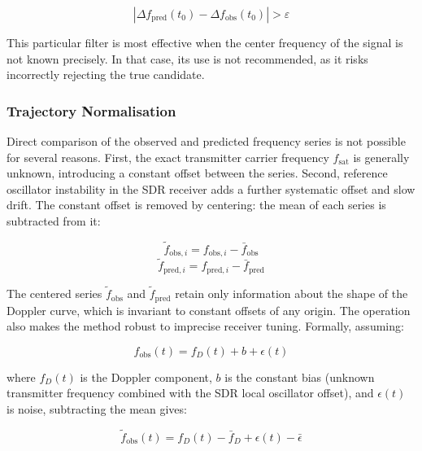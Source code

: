 \documentclass[lineno,pdflatex,sn-basic,referee,]{sn-jnl}
\begin{document}
\begin{equation}
    \left|\Delta f_{\mathrm{pred}}(t_0) - \Delta f_{\mathrm{obs}}(t_0)\right|
    > \varepsilon
    \label{eq:doppler-prefilter}
\end{equation}

This particular filter is most effective when the center frequency of the signal is not known precisely. In that case, its use is not recommended, as it risks incorrectly rejecting the true candidate.

\subsubsection{Trajectory Normalisation}
\label{subsubsec:normalisation}

Direct comparison of the observed and predicted frequency series is not possible for several reasons. First, the exact transmitter carrier frequency $f_{\mathrm{sat}}$ is generally unknown, introducing a constant offset between the series. Second, reference oscillator instability in the SDR receiver adds a further systematic offset and slow drift. The constant offset is removed by centering: the mean of each series is subtracted from it:

\begin{equation}
    \tilde{f}_{\mathrm{obs},i} = f_{\mathrm{obs},i} - \bar{f}_{\mathrm{obs}}
    \label{eq:center-obs}
\end{equation}
\begin{equation}
    \tilde{f}_{\mathrm{pred},i} = f_{\mathrm{pred},i} - \bar{f}_{\mathrm{pred}}
    \label{eq:center-pred}
\end{equation}

The centered series $\tilde{f}_{\mathrm{obs}}$ and $\tilde{f}_{\mathrm{pred}}$ retain only information about the shape of the Doppler curve, which is invariant to constant offsets of any origin. The operation also makes the method robust to imprecise receiver tuning. Formally, assuming:

\begin{equation}
    f_{\mathrm{obs}}(t) = f_D(t) + b + \epsilon(t)
    \label{eq:noise-model}
\end{equation}

\noindent
where $f_D(t)$ is the Doppler component, $b$ is the constant bias (unknown transmitter frequency combined with the SDR local oscillator offset), and $\epsilon(t)$ is noise, subtracting the mean gives:

\begin{equation}
    \tilde{f}_{\mathrm{obs}}(t) = f_D(t) - \bar{f}_D + \epsilon(t) - \bar{\epsilon}
    \label{eq:after-centering}
\end{equation}
\end{document}
